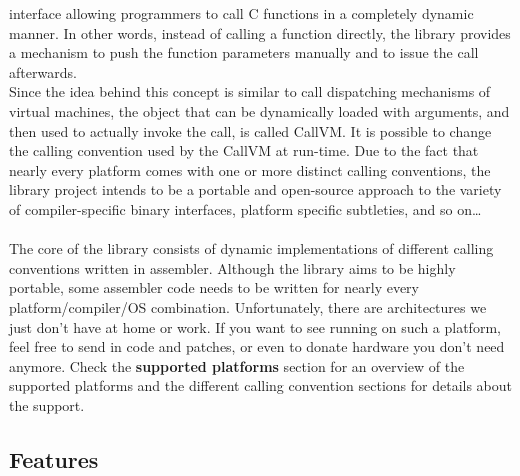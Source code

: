 interface allowing programmers to call C functions 
in a completely dynamic manner. In other words, instead of calling a function 
directly, the  library provides a mechanism to push the function parameters 
manually and to issue the call afterwards.\\
Since the idea behind this concept is similar to call dispatching mechanisms
of virtual machines, the object that can be dynamically loaded with arguments,
and then used to actually invoke the call, is called CallVM. It is possible to
change the calling convention used by the CallVM at run-time.
Due to the fact that nearly every platform comes with one or more distinct calling
conventions, the  library project intends to be a portable and open-source
approach to the variety of compiler-specific binary interfaces, platform specific
subtleties, and so on\ldots\\
\\
The core of the library consists of dynamic implementations of different 
calling conventions written in assembler.
Although the library aims to be highly portable, some assembler code needs to 
be written for nearly every platform/compiler/OS combination.
Unfortunately, there are architectures we just don't have at home or work. If 
you want to see  running on such a platform, feel free to send
in code and patches, or even to donate hardware you don't need anymore.
Check the {\bf supported platforms} section for an overview of the supported 
platforms and the different calling convention sections for details about the 
support.
\\
\begin{comment}
@@@
A typical binary library consists of symbolic names that map to variables and
functions, the latter being pre-compiled for a
specific calling convention and architecture. Given \product{dyncall} has been ported to
that binary platform, it is possible to call such a function dynamically 
without writing glue code or prototypes or even knowing its C declaration - 
all that is needed is a pointer to it.\\
To avoid confusion, note that from the point of view of the library all 
parameters are handled the same way, even though the implementation might use
other ways to pass parameters in order to suit specific calling conventions.\\
\end{comment}


\subsection{Features}

